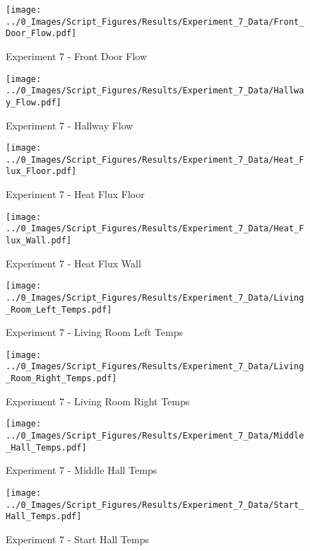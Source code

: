 	\clearpage

	\begin{figure}[H]
		\centering
		\texttt{[image: ../0\_Images/Script\_Figures/Results/Experiment\_7\_Data/Front\_Door\_Flow.pdf]}
		\caption[]{Experiment 7 - Front Door Flow}
	\end{figure}
 

	\begin{figure}[H]
		\centering
		\texttt{[image: ../0\_Images/Script\_Figures/Results/Experiment\_7\_Data/Hallway\_Flow.pdf]}
		\caption[]{Experiment 7 - Hallway Flow}
	\end{figure}
 
	\clearpage

	\begin{figure}[H]
		\centering
		\texttt{[image: ../0\_Images/Script\_Figures/Results/Experiment\_7\_Data/Heat\_Flux\_Floor.pdf]}
		\caption[]{Experiment 7 - Heat Flux Floor}
	\end{figure}
 

	\begin{figure}[H]
		\centering
		\texttt{[image: ../0\_Images/Script\_Figures/Results/Experiment\_7\_Data/Heat\_Flux\_Wall.pdf]}
		\caption[]{Experiment 7 - Heat Flux Wall}
	\end{figure}
 
	\clearpage

	\begin{figure}[H]
		\centering
		\texttt{[image: ../0\_Images/Script\_Figures/Results/Experiment\_7\_Data/Living\_Room\_Left\_Temps.pdf]}
		\caption[]{Experiment 7 - Living Room Left Temps}
	\end{figure}
 

	\begin{figure}[H]
		\centering
		\texttt{[image: ../0\_Images/Script\_Figures/Results/Experiment\_7\_Data/Living\_Room\_Right\_Temps.pdf]}
		\caption[]{Experiment 7 - Living Room Right Temps}
	\end{figure}
 
	\clearpage

	\begin{figure}[H]
		\centering
		\texttt{[image: ../0\_Images/Script\_Figures/Results/Experiment\_7\_Data/Middle\_Hall\_Temps.pdf]}
		\caption[]{Experiment 7 - Middle Hall Temps}
	\end{figure}
 

	\begin{figure}[H]
		\centering
		\texttt{[image: ../0\_Images/Script\_Figures/Results/Experiment\_7\_Data/Start\_Hall\_Temps.pdf]}
		\caption[]{Experiment 7 - Start Hall Temps}
	\end{figure}
 
